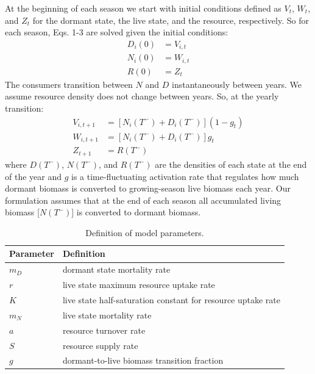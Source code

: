 \documentclass[12pt]{article}
\begin{document}
At the beginning of each season we start with initial conditions defined as $V_{t}$, $W_{t}$, and $Z_{t}$ for the dormant state, the live state, and the resource, respectively. So for each season, Eqs. 1-3 are solved given the initial conditions:
\begin{align}
  D_{i}(0) &= V_{i,t} \\
  N_{i}(0) &= W_{i,t} \\
  R(0) &= Z_{t}
\end{align}
The consumers transition between $N$ and $D$ instantaneously between years. We assume resource density does not change between years. So, at the yearly transition:
\begin{align}
  V_{i,t+1} &= [N_{i}(T^-)+D_{i}(T^-)](1-g_{t}) \\
  W_{i,t+1} &= [N_{i}(T^-)+D_{i}(T^-)]g_{t} \\
  Z_{t+1} &= R(T^-)
\end{align}
where $D(T^-)$, $N(T^-)$, and $R(T^-)$ are the densities of each state at the end of the year and $g$ is a time-fluctuating activation rate that regulates how much dormant biomass is converted to growing-season live biomass each year. Our formulation assumes that at the end of each season all accumulated living biomass [$N(T^-)$] is converted to dormant biomass.

\begin{center}
\begin{table}
\caption{Definition of model parameters.}
\begin{tabular}{l l}
\hline
Parameter & Definition \\
\hline
$m_{D}$ & dormant state mortality rate \\
$r$ & live state maximum resource uptake rate \\
$K$ & live state half-saturation constant for resource uptake rate \\
$m_{N}$ & live state mortality rate \\
$a$ & resource turnover rate \\
$S$ & resource supply rate \\
$g$ & dormant-to-live biomass transition fraction \\ 
\hline
\end{tabular}
\end{table}
\end{center}
\end{document}
